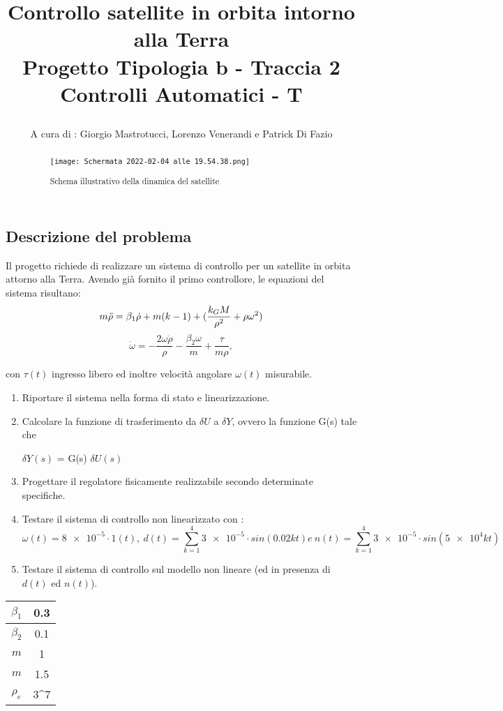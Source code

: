 \documentclass{article}
\title{
Controllo satellite in orbita intorno alla Terra\\
  \large Progetto Tipologia b - Traccia 2 \\
Controlli Automatici - T

}
\author{A cura di : Giorgio Mastrotucci, Lorenzo Venerandi e Patrick Di Fazio}
\date{}
\begin{document}
\maketitle

\begin{abstract}
\begin{figure}[h!]
\centering
\texttt{[image: Schermata 2022-02-04 alle 19.54.38.png]}
\caption{\label{fig:orbit}Schema illustrativo della dinamica del satellite}
\end{figure}
\end{abstract}

\begin{center}
\section*{Descrizione del problema}
\end{center}
Il progetto richiede di realizzare un sistema di controllo per un satellite in orbita attorno alla Terra.
Avendo già fornito il primo controllore, le equazioni del sistema risultano:
\[m \Ddot{\rho} = \beta_1\Dot{\rho} + m(k-1)+  (\frac{k_G M}{\rho^{2}} + \rho \omega^{2}) \]
\[\Dot{\omega} = -\frac{2\omega \Dot{\rho} }{\rho} -
\frac{\beta_2 \omega }{m}+ \frac{\tau}{m \rho} ,\]

con $\tau(t)$ ingresso libero ed inoltre velocità angolare $\omega(t)$ misurabile.


\begin{enumerate}
\item Riportare il sistema nella forma di stato e linearizzazione.
\item Calcolare la funzione di trasferimento da $\delta U$  a  $\delta Y$,  ovvero la funzione G(s) tale che  \begin{center} $\delta Y (s)$ = G(s) $\delta U (s)$ \end{center}
\item Progettare il regolatore fisicamente realizzabile secondo determinate specifiche.
\item Testare il sistema di controllo non linearizzato con :
\[	\omega(t)=\num{8e-5} \cdot 1(t) , \ d(t)= \sum_{k=1}^4 \num{3e-5}\cdot sin(0.02kt) e \  n(t)= \sum_{k=1}^4 \num{3e-5}\cdot sin(\num{5e4}kt)\]
\item Testare il sistema di controllo sul modello non lineare (ed in presenza di $d(t)$ ed $n(t)$).
\end{enumerate}


\begin{center}
\begin{tabular}{||c | c ||} 

 \hline\hline
 $\beta_1$ & 0.3 \\ 
 \hline
 $\beta_2$& 0.1  \\
 \hline
 $m$ & 1 \\
 \hline
 $m$  & 1.5  \\
 \hline
 $\rho_e$  & 3\cdot 10^{7} \\ [2ex] 
 \hline
\end{tabular}
\end{center}
\end{document}
